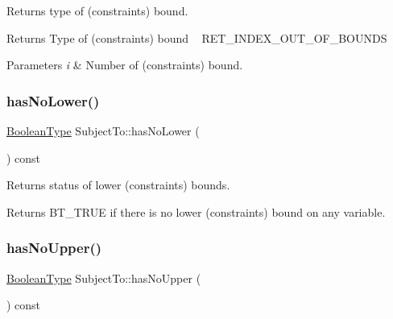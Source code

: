 Returns type of (constraints\textquotesingle{}) bound. \begin{DoxyReturn}{Returns}
Type of (constraints\textquotesingle{}) bound ~\newline
 R\+E\+T\+\_\+\+I\+N\+D\+E\+X\+\_\+\+O\+U\+T\+\_\+\+O\+F\+\_\+\+B\+O\+U\+N\+DS 
\end{DoxyReturn}

\begin{DoxyParams}{Parameters}
{\em i} & Number of (constraints\textquotesingle{}) bound. \\
\hline
\end{DoxyParams}
\mbox{\label{class_subject_to_a6e11c242c3792483b438473c813ec323}} 
\subsubsection{\texorpdfstring{has\+No\+Lower()}{hasNoLower()}}
{\footnotesize\ttfamily \hyperlink{_types_8hpp_a20f82124c82b6f5686a7fce454ef9089}{Boolean\+Type} Subject\+To\+::has\+No\+Lower (\begin{DoxyParamCaption}{ }\end{DoxyParamCaption}) const\hspace{0.3cm}{\ttfamily [inline]}}

Returns status of lower (constraints\textquotesingle{}) bounds. \begin{DoxyReturn}{Returns}
B\+T\+\_\+\+T\+R\+UE if there is no lower (constraints\textquotesingle{}) bound on any variable. 
\end{DoxyReturn}
\mbox{\label{class_subject_to_a89f1aefda7a58a2a040ba7b4d030c821}} 
\subsubsection{\texorpdfstring{has\+No\+Upper()}{hasNoUpper()}}
{\footnotesize\ttfamily \hyperlink{_types_8hpp_a20f82124c82b6f5686a7fce454ef9089}{Boolean\+Type} Subject\+To\+::has\+No\+Upper (\begin{DoxyParamCaption}{ }\end{DoxyParamCaption}) const\hspace{0.3cm}{\ttfamily [inline]}}

